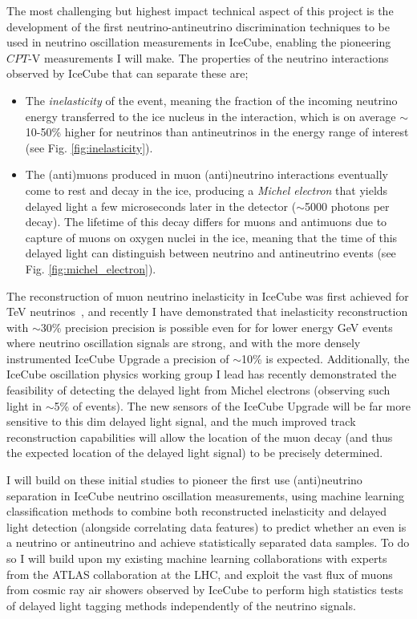 \documentclass[a4paper,11pt]{article}
\begin{document}
The most challenging but highest impact technical aspect of this project is the development of the first neutrino-antineutrino discrimination techniques to be used in neutrino oscillation measurements in IceCube, enabling the pioneering $CPT$-V measurements I will make. The properties of the neutrino interactions observed by IceCube that can separate these are;

\begin{itemize}
    \item The \textit{inelasticity} of the event, meaning the fraction of the incoming neutrino energy transferred to the ice nucleus in the interaction, which is on average $\sim$10-50\%  higher for neutrinos than antineutrinos in the energy range of interest (see Fig. \ref{fig:inelasticity}).
    \item The (anti)muons produced in muon (anti)neutrino interactions eventually come to rest and decay in the ice, producing a \textit{Michel electron} that yields delayed light a few microseconds later in the detector ($\sim$5000 photons per decay). The lifetime of this decay differs for muons and antimuons due to capture of muons on oxygen nuclei in the ice, meaning that the time of this delayed light can distinguish between neutrino and antineutrino events (see Fig. \ref{fig:michel_electron}). 
\end{itemize}

The reconstruction of muon neutrino inelasticity in IceCube was first achieved for TeV neutrinos~\cite{Aartsen:2018vez}, and recently I have demonstrated that inelasticity reconstruction with $\sim$30\% precision precision is possible even for for lower energy GeV events where neutrino oscillation signals are strong, and with the more densely instrumented IceCube Upgrade a precision of $\sim$10\% is expected. Additionally, the IceCube oscillation physics working group I lead has recently demonstrated the feasibility of detecting the delayed light from Michel electrons (observing such light in $\sim$5\% of events). The new sensors of the IceCube Upgrade will be far more sensitive to this dim delayed light signal, and the much improved track reconstruction capabilities will allow the location of the muon decay (and thus the expected location of the delayed light signal) to be precisely determined.

I will build on these initial studies to pioneer the first use (anti)neutrino separation in IceCube neutrino oscillation measurements, using machine learning classification methods to combine both reconstructed inelasticity and delayed light detection (alongside correlating data features) to predict whether an even is a neutrino or antineutrino and achieve statistically separated data samples. To do so I will build upon my existing machine learning collaborations with experts from the ATLAS collaboration at the LHC, and exploit the vast flux of muons from cosmic ray air showers observed by IceCube to perform high statistics tests of delayed light tagging methods independently of the neutrino signals.
\end{document}

